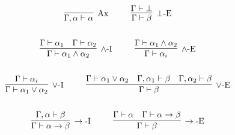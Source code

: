 \begin{gather*}
\infer[\mbox{Ax}]{\Gamma, \alpha \vdash \alpha}{}
~~~~ ~~~~
\infer[\bot\mbox{-E}]{\Gamma \vdash \beta}{\Gamma \vdash \bot}
\\ \\ 
\infer[\wedge\mbox{-I}]{\Gamma \vdash \alpha_1 \wedge \alpha_2}{
    \Gamma \vdash \alpha_1
    &
    \Gamma \vdash \alpha_2
}
~~~~ ~~~~
\infer[\wedge\mbox{-E}]{\Gamma \vdash \alpha_i}{
    \Gamma \vdash \alpha_1 \wedge \alpha_2
}
\\ \\ 
\infer[\vee\mbox{-I}]{\Gamma\vdash \alpha_1 \vee \alpha_2}{\Gamma \vdash \alpha_i}
~~~~ ~~~~
\infer[\vee\mbox{-E}]{\Gamma \vdash \beta}{
    \Gamma \vdash \alpha_1 \vee \alpha_2
    &
    \Gamma, \alpha_1 \vdash \beta
    &
    \Gamma, \alpha_2 \vdash \beta
}
\\ \\ 
\infer[\rightarrow\mbox{-I}]{\Gamma \vdash \alpha \rightarrow \beta}{\Gamma, \alpha \vdash \beta}
~~~~ ~~~~
\infer[\rightarrow\mbox{-E}]{\Gamma \vdash \beta}{\Gamma \vdash \alpha & \Gamma \vdash \alpha \rightarrow \beta}
\end{gather*}